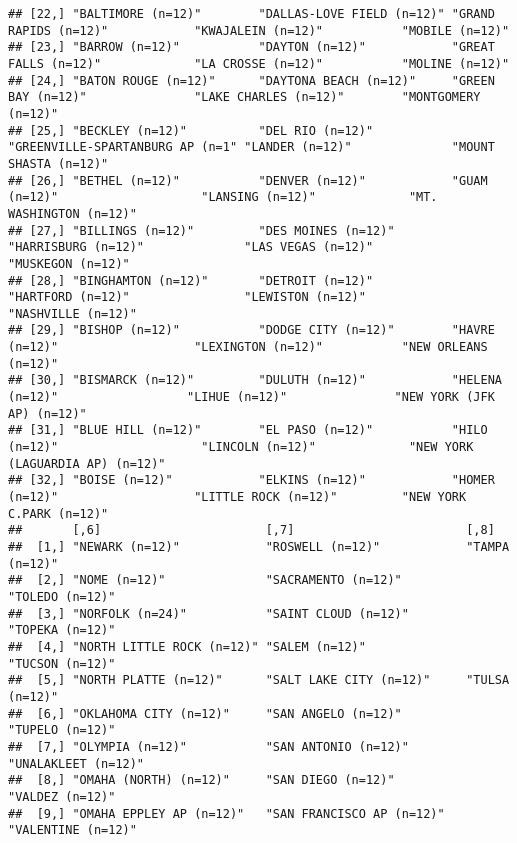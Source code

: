 \documentclass[
]{book}
\begin{document}
\begin{verbatim}
## [22,] "BALTIMORE (n=12)"        "DALLAS-LOVE FIELD (n=12)" "GRAND RAPIDS (n=12)"            "KWAJALEIN (n=12)"           "MOBILE (n=12)"                 
## [23,] "BARROW (n=12)"           "DAYTON (n=12)"            "GREAT FALLS (n=12)"             "LA CROSSE (n=12)"           "MOLINE (n=12)"                 
## [24,] "BATON ROUGE (n=12)"      "DAYTONA BEACH (n=12)"     "GREEN BAY (n=12)"               "LAKE CHARLES (n=12)"        "MONTGOMERY (n=12)"             
## [25,] "BECKLEY (n=12)"          "DEL RIO (n=12)"           "GREENVILLE-SPARTANBURG AP (n=1" "LANDER (n=12)"              "MOUNT SHASTA (n=12)"           
## [26,] "BETHEL (n=12)"           "DENVER (n=12)"            "GUAM (n=12)"                    "LANSING (n=12)"             "MT. WASHINGTON (n=12)"         
## [27,] "BILLINGS (n=12)"         "DES MOINES (n=12)"        "HARRISBURG (n=12)"              "LAS VEGAS (n=12)"           "MUSKEGON (n=12)"               
## [28,] "BINGHAMTON (n=12)"       "DETROIT (n=12)"           "HARTFORD (n=12)"                "LEWISTON (n=12)"            "NASHVILLE (n=12)"              
## [29,] "BISHOP (n=12)"           "DODGE CITY (n=12)"        "HAVRE (n=12)"                   "LEXINGTON (n=12)"           "NEW ORLEANS (n=12)"            
## [30,] "BISMARCK (n=12)"         "DULUTH (n=12)"            "HELENA (n=12)"                  "LIHUE (n=12)"               "NEW YORK (JFK AP) (n=12)"      
## [31,] "BLUE HILL (n=12)"        "EL PASO (n=12)"           "HILO (n=12)"                    "LINCOLN (n=12)"             "NEW YORK (LAGUARDIA AP) (n=12)"
## [32,] "BOISE (n=12)"            "ELKINS (n=12)"            "HOMER (n=12)"                   "LITTLE ROCK (n=12)"         "NEW YORK C.PARK (n=12)"        
##       [,6]                       [,7]                        [,8]                         
##  [1,] "NEWARK (n=12)"            "ROSWELL (n=12)"            "TAMPA (n=12)"               
##  [2,] "NOME (n=12)"              "SACRAMENTO (n=12)"         "TOLEDO (n=12)"              
##  [3,] "NORFOLK (n=24)"           "SAINT CLOUD (n=12)"        "TOPEKA (n=12)"              
##  [4,] "NORTH LITTLE ROCK (n=12)" "SALEM (n=12)"              "TUCSON (n=12)"              
##  [5,] "NORTH PLATTE (n=12)"      "SALT LAKE CITY (n=12)"     "TULSA (n=12)"               
##  [6,] "OKLAHOMA CITY (n=12)"     "SAN ANGELO (n=12)"         "TUPELO (n=12)"              
##  [7,] "OLYMPIA (n=12)"           "SAN ANTONIO (n=12)"        "UNALAKLEET (n=12)"          
##  [8,] "OMAHA (NORTH) (n=12)"     "SAN DIEGO (n=12)"          "VALDEZ (n=12)"              
##  [9,] "OMAHA EPPLEY AP (n=12)"   "SAN FRANCISCO AP (n=12)"   "VALENTINE (n=12)"           

\end{verbatim}
\end{document}
